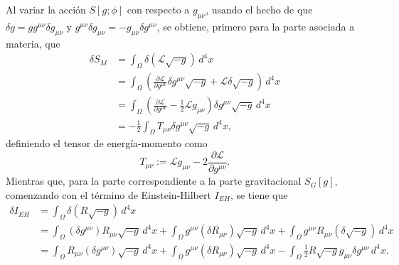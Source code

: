 Al variar la acción $S[g; \phi]$ con respecto a $g_{\mu \nu}$, usando el hecho de que $\delta g = g g^{\mu \nu} \delta g_{\mu \nu}$ y $g^{\mu \nu} \delta g_{\mu \nu} = -g_{\mu \nu} \delta g^{\mu \nu}$, se obtiene, primero para la parte asociada a materia, que
%
\begin{align}
\label{eq:varSML}
\delta S_{M} & = \int_{\Omega} \delta (\mathcal{L} \sqrt{-g}) \, d^{4} x \nonumber \\
& = \int_{\Omega} \left( \frac{\partial \mathcal{L}}{\partial g^{\mu \nu}} \delta g^{\mu \nu} \sqrt{-g} + \mathcal{L} \delta \sqrt{-g} \right) \, d^{4} x \nonumber \\
& = \int_{\Omega} \left( \frac{\partial \mathcal{L}}{\partial g^{\mu \nu}} - \frac{1}{2} \mathcal{L} g_{\mu \nu} \right) \delta g^{\mu \nu} \sqrt{-g} \, d^{4} x \nonumber \\
& = - \frac{1}{2} \int_{\Omega} T_{\mu \nu} \delta g^{\mu \nu} \sqrt{-g} \, d^{4} x,
\end{align}
%
definiendo el tensor de energía-momento como
%
\begin{equation}
\label{eq:TabL}
T_{\mu \nu} := \mathcal{L} g_{\mu \nu} - 2 \frac{\partial \mathcal{L}}{\partial g^{\mu \nu}}.
\end{equation}
%
%
%
Mientras que, para la parte correspondiente a la parte gravitacional $S_{G}[g]$, comenzando con el término de Einstein-Hilbert $I_{EH}$, se tiene que
%
\begin{align}
\label{eq:IEH}
\delta I_{EH} & = \int_{\Omega} \delta(R \sqrt{-g}) \, d^{4} x \nonumber \\
& = \int_{\Omega} (\delta g^{\mu \nu}) R_{\mu \nu} \sqrt{-g} \, d^{4} x + \int_{\Omega} g^{\mu \nu} (\delta R_{\mu \nu}) \sqrt{-g} \, d^{4} x + \int_{\Omega} g^{\mu \nu} R_{\mu \nu} (\delta \sqrt{-g}) \, d^{4} x \nonumber \\
& = \int_{\Omega} R_{\mu \nu} (\delta g^{\mu \nu}) \sqrt{-g} \, d^{4} x + \int_{\Omega} g^{\mu \nu} (\delta R_{\mu \nu}) \sqrt{-g} \, d^{4} x -  \int_{\Omega} \frac{1}{2} R \sqrt{-g} g_{\mu \nu} \delta g^{\mu \nu} \, d^{4} x.
\end{align}


